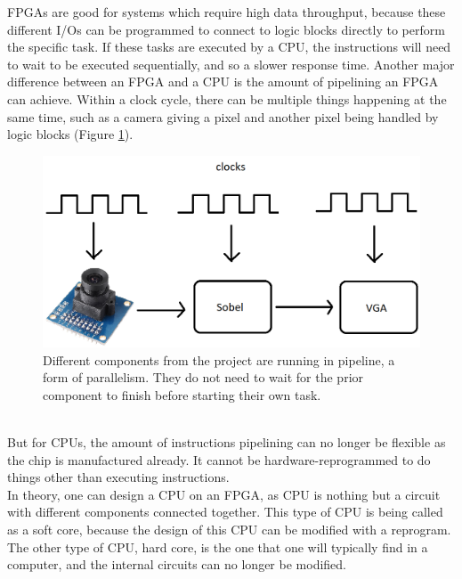 \documentclass{article}
\begin{document}
		FPGAs are good for systems which require high data throughput, because these different I/Os can be programmed to connect to logic blocks directly to perform the specific task. If these tasks are executed by a CPU, the instructions will need to wait to be executed sequentially, and so a slower response time. Another major difference between an FPGA and a CPU is the amount of pipelining an FPGA can achieve. Within a clock cycle, there can be multiple things happening at the same time, such as a camera giving a pixel and another pixel being handled by logic blocks (Figure \ref{fig:pipelining}).
	\begin{figure}[h]
		\centering
		\includegraphics[scale=0.45]{pipelining}
		\caption{Different components from the project are running in pipeline, a form of parallelism. They do not need to wait for the prior component to finish before starting their own task.}
		\label{fig:pipelining}
	\end{figure}
	\\
	
	But for CPUs, the amount of instructions pipelining can no longer be flexible as the chip is manufactured already. It cannot be hardware-reprogrammed to do things other than executing instructions. 
	\\
	
		In theory, one can design a CPU on an FPGA, as CPU is nothing but a circuit with different components connected together. This type of CPU is being called as a soft core, because the design of this CPU can be modified with a reprogram. The other type of CPU, hard core, is the one that one will typically find in a computer, and the internal circuits can no longer be modified.
		
\end{document}

